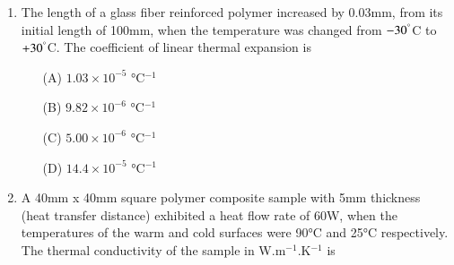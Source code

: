 \documentclass[journal,12pt,onecolumn]{IEEEtran}
\theoremstyle{remark}
\begin{document}
\begin{enumerate}
\begin{multicols}{2}
\textbf{Additive:}
\begin{enumerate}
    \item $\alpha$-Cellulose
    \item Zinc chromate
    \item Alumina trihydrate
    \item Chlorinated paraffin wax
\end{enumerate}

\textbf{Function:}
\begin{enumerate}
    \item Flame retarder
    \item Plasticizer extender
    \item Organic fibrous filler
    \item Colorant
\end{enumerate}
\end{multicols}

\begin{multicols}{2}
\begin{enumerate}
    \item[(A)] P-1; Q-2; R-3; S-4
    \item[(B)] P-2; Q-3; R-4; S-1
    \item[(C)] P-3; Q-4; R-1; S-2
    \item[(D)] P-4; Q-1; R-2; S-3
\end{enumerate}
\end{multicols}

\item The length of a glass fiber reinforced polymer increased by 0.03mm, from its initial length of 100mm, when the temperature was changed from $-30^\degree$C to $+30^\degree$C. The coefficient of linear thermal expansion is

\begin{multicols}{4}
\begin{enumerate}
    \item[(A)] $1.03 \times 10^{-5}$ °C$^{-1}$
    \item[(B)] $9.82 \times 10^{-6}$ °C$^{-1}$
    \item[(C)] $5.00 \times 10^{-6}$ °C$^{-1}$
    \item[(D)] $14.4 \times 10^{-5}$ °C$^{-1}$
\end{enumerate}
\end{multicols}

\item A 40mm x 40mm square polymer composite sample with 5mm thickness (heat transfer distance) exhibited a heat flow rate of 60W, when the temperatures of the warm and cold surfaces were 90°C and 25°C respectively. The thermal conductivity of the sample in W.m$^{-1}$.K$^{-1}$ is


\end{enumerate}
\end{document}
